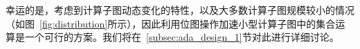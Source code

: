 幸运的是，考虑到计算子图动态变化的特性，以及大多数计算子图规模较小的情况（如图~\ref{fig:distribution}所示），因此利用位图操作加速小型计算子图中的集合运算是一个可行的方案。我们将在~\ref{subsec:ada_design_1}节对此进行详细讨论。










